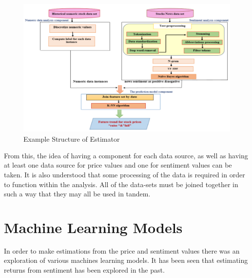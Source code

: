 \begin{figure}[h!]
    \centering
    \includegraphics[width=15cm,height=7cm,keepaspectratio]{background/exStructure.png}
    \caption{Example Structure of Estimator\cite{khedr2017predicting}}
    \label{fig:exStructure}
\end{figure}

From this, the idea of having a component for each data source, as well as having at least one data source for price values and one for sentiment values can be taken. It is also understood that some processing of the data is required in order to function within the analysis. All of the data-sets must be joined together in such a way that they may all be used in tandem.

\section{Machine Learning Models}

In order to make estimations from the price and sentiment values there was an exploration of various machines learning models. It has been seen that estimating returns from sentiment has been explored in the past\cite{khedr2017predicting}.

